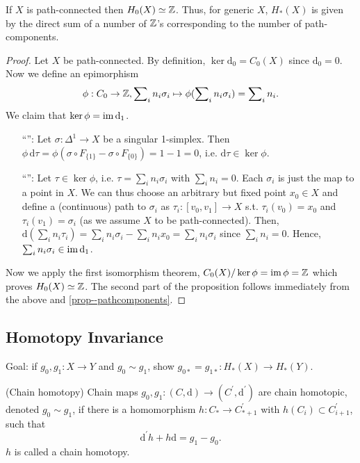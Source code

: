 \documentclass[a4paper,11pt]{article}
\begin{document}
			\begin{prop}
				If $X$ is path-connected then $H_0(X)\simeq\mathbb{Z}$. Thus, for generic $X$, $H_\ast(X)$ is given by the direct sum of a number of $\mathbb{Z}$'s corresponding to the number of path-components.
			\end{prop}
			\begin{proof}
				Let $X$ be path-connected. By definition, $\ker\mathrm{d}_0=C_0(X)$ since $\mathrm{d}_0=0$. Now we define an epimorphism \[\phi:C_0\rightarrow \mathbb{Z}, \sum\nolimits_i n_i\sigma_i\mapsto\phi(\sum\nolimits_in_i\sigma_i)=\sum\nolimits_in_i.\] 
				We claim that $\ker\phi=\operatorname{im}\mathrm{d}_1$.
				\begin{enumerate}\setlength\itemsep{-.4em}
					\item[``\supseteq'':] Let $\sigma:\Delta^1\rightarrow X$ be a singular 1-simplex. Then $\phi\,\mathrm{d}\tau=\phi(\sigma\circ F_{\{1\}}-\sigma\circ F_{\{0\}})=1-1=0$, i.e. $\mathrm{d}\tau\in\ker\phi$.
					\item[``\subseteq'':] Let $\tau\in\ker\phi$, i.e. $\tau=\sum_in_i\sigma_i$ with $\sum_in_i=0$. Each $\sigma_i$ is just the map to a point in $X$. We can thus choose an arbitrary but fixed point $x_0\in X$ and define a (continuous) path to $\sigma_i$ as $\tau_i:[v_0,v_1]\rightarrow X$ s.t. $\tau_i(v_0)=x_0$ and $\tau_i(v_1)=\sigma_i$ (as we assume $X$ to be path-connected). Then, $\mathrm{d}(\sum_in_i\tau_i)=\sum_in_i\sigma_i-\sum_in_ix_0=\sum_in_i\sigma_i$ since $\sum_in_i=0$. Hence, $\sum_in_i\sigma_i\in\operatorname{im}\mathrm{d}_1$.  
				\end{enumerate}
				Now we apply the first isomorphism theorem, $C_0(X)/\ker\phi=\operatorname{im}\phi=\mathbb{Z}$ which proves $H_0(X)\simeq\mathbb{Z}$. The second part of the proposition follows immediately from the above and \autoref{prop--pathcomponents}.
			\end{proof}


		\subsection{Homotopy Invariance}
			Goal: if $g_0,g_1:X\rightarrow Y$ and $g_0\sim g_1$, show $g_{0\ast}= g_{1\ast}:H_\ast(X)\rightarrow H_\ast(Y)$.

			\begin{defi}
				(Chain homotopy) Chain maps $g_0,g_1:(C,\mathrm{d})\rightarrow (C^{\prime},\mathrm{d}^{\prime})$ are chain homotopic, denoted $g_0\sim g_1$, if there is a homomorphism $h:C_\ast\rightarrow C^{\prime}_{\ast+1}$ with $h(C_i)\subset C^{\prime}_{i+1}$, such that
				\begin{equation*}
					\mathrm{d}^{\prime}h+h\mathrm{d}=g_1-g_0.
				\end{equation*}
				$h$ is called a chain homotopy.
			\end{defi}
\end{document}
